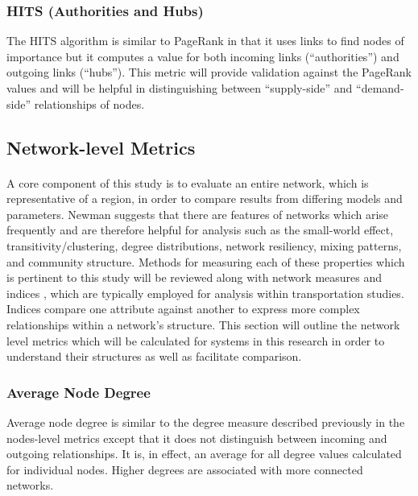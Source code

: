 \documentclass[12pt,a4paper]{thesis}
\begin{document}
\subsubsection{HITS (Authorities and Hubs)}
The HITS algorithm \citetext{\citealp{Kle99}; \citealp{PageRank}} is similar to PageRank in that it uses links to find nodes of importance but it computes a value for both incoming links (``authorities'') and outgoing links (``hubs''). This metric will provide validation against the PageRank values and will be helpful in distinguishing between ``supply-side'' and ``demand-side'' relationships of nodes.

\subsection{Network-level Metrics}

\paragraph{}
A core component of this study is to evaluate an entire network, which is representative of a region, in order to compare results from differing models and parameters. Newman \citeyearpar{New03} suggests that there are features of networks which arise frequently and are therefore helpful for analysis such as the small-world effect, transitivity/clustering, degree distributions, network resiliency, mixing patterns, and community structure. Methods for measuring each of these properties which is pertinent to this study will be reviewed along with network measures and indices \citep{RodComSla06}, which are typically employed for analysis within transportation studies. Indices compare one attribute against another to express more complex relationships within a network's structure. This section will outline the network level metrics which will be calculated for systems in this research in order to understand their structures as well as facilitate comparison.


\subsubsection{Average Node Degree}
Average node degree is similar to the degree measure described previously in the nodes-level metrics except that it does not distinguish between incoming and outgoing relationships. It is, in effect, an average for all degree values calculated for individual nodes. Higher degrees are associated with more connected networks.  
\end{document}
